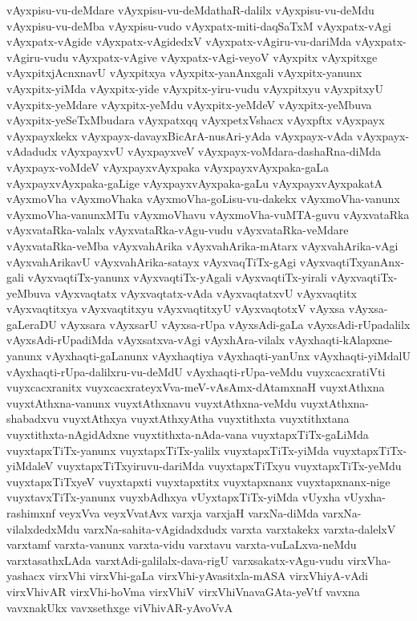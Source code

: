 {vAyxpisu-vu-deMdare
vAyxpisu-vu-deMdathaR-dalilx
vAyxpisu-vu-deMdu
vAyxpisu-vu-deMba
vAyxpisu-vudo
vAyxpatx-miti-daqSaTxM
vAyxpatx-vAgi
vAyxpatx-vAgide
vAyxpatx-vAgidedxV
vAyxpatx-vAgiru-vu-dariMda
vAyxpatx-vAgiru-vudu
vAyxpatx-vAgive
vAyxpatx-vAgi-veyoV
vAyxpitx
vAyxpitxge
vAyxpitxjAcnxnavU
vAyxpitxya
vAyxpitx-yanAnxgali
vAyxpitx-yanunx
vAyxpitx-yiMda
vAyxpitx-yide
vAyxpitx-yiru-vudu
vAyxpitxyu
vAyxpitxyU
vAyxpitx-yeMdare
vAyxpitx-yeMdu
vAyxpitx-yeMdeV
vAyxpitx-yeMbuva
vAyxpitx-yeSeTxMbudara
vAyxpatxqq
vAyxpetxVshacx
vAyxpftx
vAyxpayx
vAyxpayxkekx
vAyxpayx-davayxBicArA-nusAri-yAda
vAyxpayx-vAda
vAyxpayx-vAdadudx
vAyxpayxvU
vAyxpayxveV
vAyxpayx-voMdara-dashaRna-diMda
vAyxpayx-voMdeV
vAyxpayxvAyxpaka
vAyxpayxvAyxpaka-gaLa
vAyxpayxvAyxpaka-gaLige
vAyxpayxvAyxpaka-gaLu
vAyxpayxvAyxpakatA
vAyxmoVha
vAyxmoVhaka
vAyxmoVha-goLisu-vu-dakekx
vAyxmoVha-vanunx
vAyxmoVha-vanunxMTu
vAyxmoVhavu
vAyxmoVha-vuMTA-guvu
vAyxvataRka
vAyxvataRka-valalx
vAyxvataRka-vAgu-vudu
vAyxvataRka-veMdare
vAyxvataRka-veMba
vAyxvahArika
vAyxvahArika-mAtarx
vAyxvahArika-vAgi
vAyxvahArikavU
vAyxvahArika-satayx
vAyxvaqTiTx-gAgi
vAyxvaqtiTxyanAnx-gali
vAyxvaqtiTx-yanunx
vAyxvaqtiTx-yAgali
vAyxvaqtiTx-yirali
vAyxvaqtiTx-yeMbuva
vAyxvaqtatx
vAyxvaqtatx-vAda
vAyxvaqtatxvU
vAyxvaqtitx
vAyxvaqtitxya
vAyxvaqtitxyu
vAyxvaqtitxyU
vAyxvaqtotxV
vAyxsa
vAyxsa-gaLeraDU
vAyxsara
vAyxsarU
vAyxsa-rUpa
vAyxsAdi-gaLa
vAyxsAdi-rUpadalilx
vAyxsAdi-rUpadiMda
vAyxsatxva-vAgi
vAyxhAra-vilalx
vAyxhaqti-kAlapxne-yanunx
vAyxhaqti-gaLanunx
vAyxhaqtiya
vAyxhaqti-yanUnx
vAyxhaqti-yiMdalU
vAyxhaqti-rUpa-dalilxru-vu-deMdU
vAyxhaqti-rUpa-veMdu
vuyxcacxratiVti
vuyxcacxranitx
vuyxcacxrateyxVva-meV-vAsAmx-dAtamxnaH
vuyxtAthxna
vuyxtAthxna-vanunx
vuyxtAthxnavu
vuyxtAthxna-veMdu
vuyxtAthxna-shabadxvu
vuyxtAthxya
vuyxtAthxyAtha
vuyxtithxta
vuyxtithxtana
vuyxtithxta-nAgidAdxne
vuyxtithxta-nAda-vana
vuyxtapxTiTx-gaLiMda
vuyxtapxTiTx-yanunx
vuyxtapxTiTx-yalilx
vuyxtapxTiTx-yiMda
vuyxtapxTiTx-yiMdaleV
vuyxtapxTiTxyiruvu-dariMda
vuyxtapxTiTxyu
vuyxtapxTiTx-yeMdu
vuyxtapxTiTxyeV
vuyxtapxti
vuyxtapxtitx
vuyxtapxnanx
vuyxtapxnanx-nige
vuyxtavxTiTx-yanunx
vuyxbAdhxya
vUyxtapxTiTx-yiMda
vUyxha
vUyxha-rashimxnf
veyxVva
veyxVvatAvx
varxja
varxjaH
varxNa-diMda
varxNa-vilalxdedxMdu
varxNa-sahita-vAgidadxdudx
varxta
varxtakekx
varxta-dalelxV
varxtamf
varxta-vanunx
varxta-vidu
varxtavu
varxta-vuLaLxva-neMdu
varxtasathxLAda
varxtAdi-galilalx-dava-rigU
varxsakatx-vAgu-vudu
virxVha-yashacx
virxVhi
virxVhi-gaLa
virxVhi-yAvasitxla-mASA
virxVhiyA-vAdi
virxVhivAR
virxVhi-hoVma
virxVhiV
virxVhiVnavaGAta-yeVtf
vavxna
vavxnakUkx
vavxsethxge
viVhivAR-yAvoVvA
}
